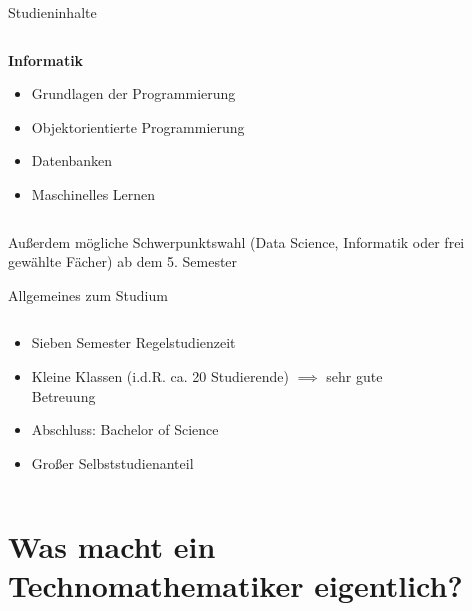 \documentclass[10pt]{beamer}
\begin{document}
\begin{frame}[fragile]{Studieninhalte}
\begin{columns}
{      \begin{column}{.3\textwidth}
        \textbf{Informatik}\\
        \begin{itemize}
          \item Grundlagen der Programmierung
          \item Objektorientierte Programmierung
          \item Datenbanken
          \item Maschinelles Lernen
        \end{itemize}
      \end{column}
    }
  \end{columns}
  Außerdem mögliche Schwerpunktswahl (Data Science, Informatik oder frei gewählte Fächer) ab dem 5. Semester
\end{frame}

\begin{frame}[fragile]{Allgemeines zum Studium}
  \begin{columns}
    \begin{column}{.6\textwidth}
      \begin{itemize}
        \item Sieben Semester Regelstudienzeit
        \item Kleine Klassen (i.d.R. ca. 20 Studierende) $\implies$ sehr gute Betreuung
        \item Abschluss: Bachelor of Science
        \item Großer Selbststudienanteil
      \end{itemize}
    \end{column}
    \begin{column}{.4\textwidth}
      \begin{figure}[ht]
      \end{figure}
    \end{column}
  \end{columns}
\end{frame}

\section{Was macht ein Technomathematiker eigentlich?}
\end{document}
